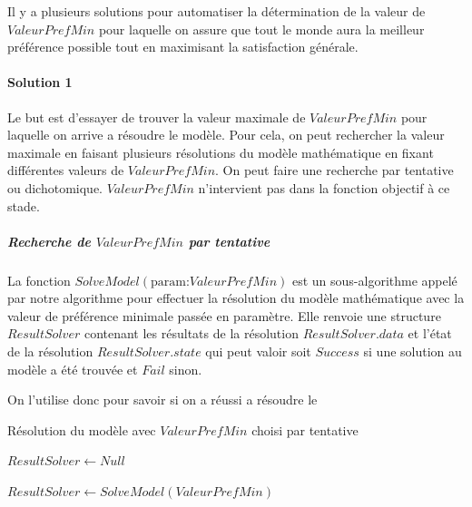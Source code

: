 \documentclass[final,poster]{polytech/polytech}
\begin{document}
Il y a plusieurs solutions pour automatiser la détermination de la valeur de $ValeurPrefMin$ pour laquelle on assure que tout le monde aura la meilleur préférence possible tout en maximisant la satisfaction générale.

\paragraph{Solution 1}
Le but est d'essayer de trouver la valeur maximale de $ValeurPrefMin$ pour laquelle on arrive a résoudre le modèle. Pour cela, on peut rechercher la valeur maximale en faisant plusieurs résolutions du modèle mathématique en fixant différentes valeurs de $ValeurPrefMin$. On peut faire une recherche par tentative ou dichotomique. $ValeurPrefMin$ n'intervient pas dans la fonction objectif à ce stade.

\subparagraph{Recherche de $ValeurPrefMin$ par tentative}

La fonction $SolveModel(\text{param:} ValeurPrefMin)$ est un sous-algorithme appelé par notre algorithme pour effectuer la résolution du modèle mathématique avec la valeur de préférence minimale passée en paramètre.
Elle renvoie une structure $ResultSolver$ contenant les résultats de la résolution $ResultSolver.data$ et l'état de la résolution $ResultSolver.state$ qui peut valoir soit $Success$ si une solution au modèle a été trouvée et $Fail$ sinon.

On l'utilise donc pour savoir si on a réussi a résoudre le
\begin{algorithm}
\caption{\label{chap:problem_affectation:algo:recherche_tatonnement}Résolution du modèle avec $ValeurPrefMin$ choisi par tentative}

$ResultSolver \gets Null$ \\

{

	$ResultSolver \gets SolveModel(ValeurPrefMin)$ \\



	{
		\Break

	}
}
\end{algorithm}
\end{document}
